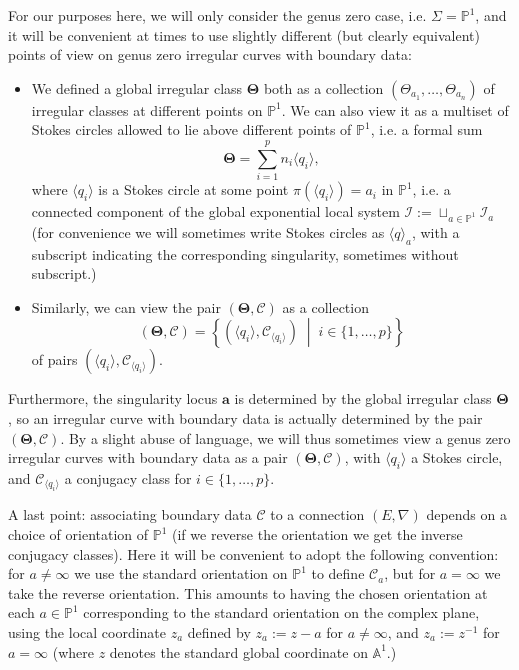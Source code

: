 \documentclass[11pt,a4paper]{amsart}
\numberwithin{equation}{section}
\newcommand{\cir}[1]{\langle #1 \rangle}
\begin{document}
\begin{notation}
For our purposes here, we will only consider the genus zero case, i.e. $\Sigma=\mathbb P^1$, and it will be convenient at times to use slightly different (but clearly equivalent) points of view on genus zero irregular curves with boundary data:
\begin{itemize}
\item We defined a global irregular class $\bm\Theta$ both as a collection $(\Theta_{a_1}, \dots, \Theta_{a_n})$ of irregular classes at different points on $\mathbb P^1$. We can also view it as a multiset of Stokes circles allowed to lie above different points of $\mathbb P^1$, i.e. a formal sum 
\begin{equation}
\bm\Theta=\sum_{i=1}^p n_i\cir{q_i},
\end{equation}
where $\cir{q_i}$ is a Stokes circle at some point $\pi(\cir{q_i})=a_i$ in $\mathbb P^1$, i.e. a connected component of the global exponential local system $\mathcal I:=\sqcup_{a\in \mathbb P^1} \mathcal I_a$ (for convenience we will sometimes write Stokes circles as $\cir{q}_a$, with a subscript indicating the corresponding singularity, sometimes without subscript.)
\item Similarly, we can view the pair $(\bm\Theta, \bm{\mathcal C})$ as a collection
\[
(\bm\Theta, \bm{\mathcal C})=\left\{ (\cir{q_i}, \mathcal C_{\cir{q_i}})\;\middle\vert\; i\in \{1, \dots, p\}\right\}
\]
of pairs $(\cir{q_i}, \mathcal C_{\cir{q_i}})$.
\end{itemize}
Furthermore, the singularity locus $\mathbf a$ is determined by the global irregular class $\bm\Theta$, so an irregular curve with boundary data is actually determined by the pair $(\bm\Theta, \bm{\mathcal C})$. By a slight abuse of language, we will thus sometimes view a genus zero irregular curves with boundary data as a pair $(\bm\Theta, \bm{\mathcal C})$, with $\cir{q_i}$ a Stokes circle, and $\mathcal C_{\cir{q_i}}$ a conjugacy class for $i\in\{1, \dots, p\}$.


A last point: associating boundary data $\bm{\mathcal C}$ to a connection $(E,\nabla)$ depends on a choice of orientation of $\mathbb P^1$ (if we reverse the orientation we get the inverse conjugacy classes). Here it will be convenient to adopt the following convention: for $a\neq \infty$ we use the standard orientation on $\mathbb P^1$ to define $\mathcal C_a$, but for $a=\infty$ we take the reverse orientation. This amounts to having the chosen orientation at each $a\in \mathbb P^1$ corresponding to the standard orientation on the complex plane, using the local coordinate $z_a$ defined by $z_a:=z-a$ for $a\neq \infty$, and $z_a:=z^{-1}$ for $a=\infty$ (where $z$ denotes the standard global coordinate on $\mathbb A^1$.) 
\end{notation}
\end{document}
